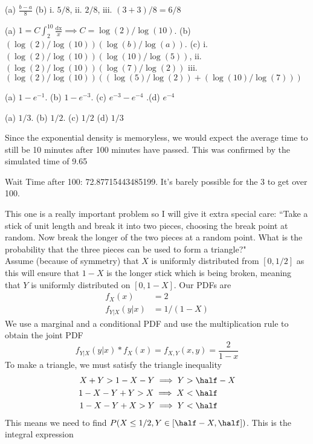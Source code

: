 \begin{oddenumerate}
	\item (a) $ \frac{b-a}{8} $ (b) i. $ 5/8 $, ii. $ 2/8 $, iii. $ (3 + 3)/8 = 6/8 $
	\item (a) $\displaystyle  1 = C\int_2^{10} \frac{\textrm{dx}}{x} \implies C = \log(2)/\log(10)$. (b) $ (\log(2)/\log(10))(\log(b)/\log(a)) $. (c) i.  $ (\log(2)/\log(10))(\log(10)/\log(5)) $, ii. $ (\log(2)/\log(10))(\log(7)/\log(2)) $ iii. $ (\log(2)/\log(10))((\log(5)/\log(2)) + (\log(10)/\log(7)))$
	\item (a) $ 1 - e^{-1} $. (b) $ 1 - e^{-3} $. (c) $ e^{-3} - e^{-4} $ .(d) $ e^{-4}$
	\item (a) $ 1/3 $. (b) $ 1/2 $. (c) $ 1/2 $ (d) $ 1/3 $
	\item Since the exponential density is memoryless, we would expect the average time to still be 10 minutes after 100 minutes have passed. This was confirmed by the simulated time of 9.65
	\item Wait Time after 100:  72.87715443485199. It's barely possible for the 3 to get over 100.
	\item This one is a really important problem so I will give it extra special care: ``Take a stick of unit length and break it into two pieces, choosing the break point at random. Now break the longer of the two pieces at a random point.
	What is the probability that the three pieces can be used to form a triangle?"
	\\ Assume (because of symmetry) that $ X $ is uniformly distributed from $ [0, 1/2] $ as this will ensure that $ 1-X $ is the longer stick which is being broken, meaning that $ Y $ is uniformly distributed on $ [0, 1-X] $.  Our PDFs are 
	\begin{align*}
		f_X(x) &= 2
		\\ f_{Y|X}(y|x) &= 1/(1-X)
	\end{align*}
	We use a marginal and a conditional PDF and use the multiplication rule to obtain the joint PDF
	\[ f_{Y|X}(y|x) * f_X(x)  = f_{X,Y}(x,y) = \frac{2}{1-x} \]
	To make a triangle, we must satisfy the triangle inequality
	\begin{align*}
		X + Y > 1 - X - Y \implies Y &> \half - X
		\\ 1 - X - Y + Y > X \implies X &< \half
		\\ 1 - X - Y + X > Y \implies Y &< \half
	\end{align*}
	This means we need to find $ P(X \leq 1/2, Y \in [\half - X, \half]) $. This is the integral expression
	 \begin{align*}

\end{align*}
\end{oddenumerate}
